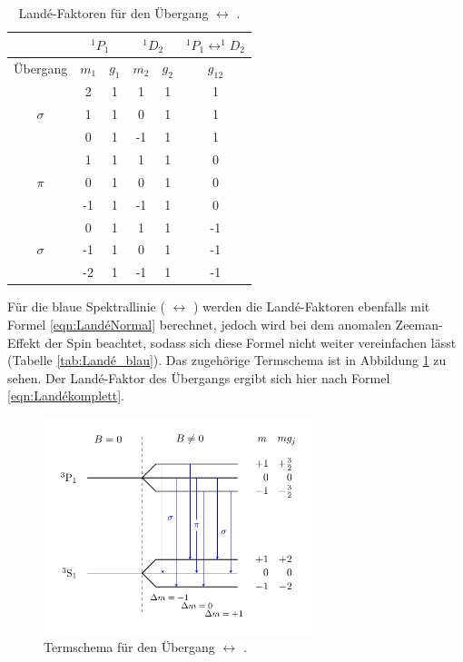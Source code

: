 \begin{table}[h]
	\centering
  \caption{Landé-Faktoren für den Übergang  $\leftrightarrow$ .}
	\label{tab:LandéRot}
	\begin{tabular}{cccccc}
		\toprule
		{} & \multicolumn{2}{c}{${}^1P_1$}  & \multicolumn{2}{c}{${}^1D_2$}  & $^1P_1\leftrightarrow ^1\!\!D_2$ \\
		\midrule
		 Übergang &   $m_1$  & $g_{1}$ & $m_2$ & $ g_2$  & $g_{12}$  \\
		\midrule
		& 2 & 1 & 1 & 1 & 1\\
		$\sigma$& 1 & 1 & 0 & 1 & 1\\
		& 0 & 1 & -1 & 1 & 1\\
		\midrule
		& 1 & 1 & 1 & 1 & 0\\
		$\pi$ & 0 & 1 & 0 & 1 & 0\\
		& -1 & 1 & -1 & 1 & 0\\
		\midrule
		& 0 & 1 & 1 & 1 & -1\\
		$\sigma$ & -1 & 1 & 0 & 1 & -1\\
		& -2 & 1 & -1 & 1 & -1\\\bottomrule
	\end{tabular}
\end{table}

Für die blaue Spektrallinie ( $\leftrightarrow$ ) werden die
Landé-Faktoren ebenfalls mit Formel \eqref{eqn:LandéNormal} berechnet, jedoch wird
bei dem anomalen Zeeman-Effekt der Spin beachtet, sodass sich diese Formel nicht
weiter vereinfachen lässt (Tabelle \ref{tab:Landé_blau}). Das zugehörige Termschema
ist in Abbildung \ref{fig:termschema_blau} zu sehen. Der Landé-Faktor des Übergangs
ergibt sich hier nach Formel \eqref{eqn:Landékomplett}.

\begin{figure}[h]
  \centering
  \includegraphics[width=0.7\textwidth]{Pics/termschema_blau.pdf}
  \caption{Termschema für den Übergang  $\leftrightarrow$  \cite{luckyjosh}.}
  \label{fig:termschema_blau}
\end{figure}

